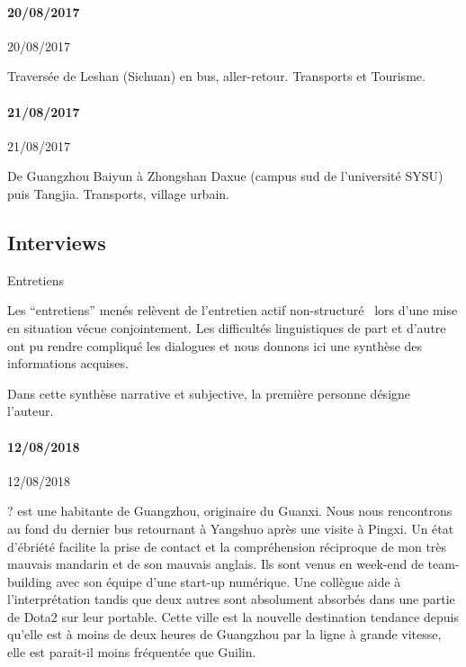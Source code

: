 \paragraph{20/08/2017}{20/08/2017}

Traversée de Leshan (Sichuan) en bus, aller-retour. Transports et Tourisme.



\paragraph{21/08/2017}{21/08/2017}

De Guangzhou Baiyun à Zhongshan Daxue (campus sud de l'université SYSU) puis Tangjia. Transports, village urbain.














\subsection{Interviews}{Entretiens}


Les ``entretiens'' menés relèvent de l'entretien actif non-structuré~\cite{holstein2004active} lors d'une mise en situation vécue conjointement. Les difficultés linguistiques de part et d'autre ont pu rendre compliqué les dialogues et nous donnons ici une synthèse des informations acquises.


Dans cette synthèse narrative et subjective, la première personne désigne l'auteur.



\paragraph{12/08/2018}{12/08/2018}

? est une habitante de Guangzhou, originaire du Guanxi. Nous nous rencontrons au fond du dernier bus retournant à Yangshuo après une visite à Pingxi. Un état d'ébriété facilite la prise de contact et la compréhension réciproque de mon très mauvais mandarin et de son mauvais anglais. Ils sont venus en week-end de team-building avec son équipe d'une start-up numérique. Une collègue aide à l'interprétation tandis que deux autres sont absolument absorbés dans une partie de Dota2 sur leur portable. Cette ville est la nouvelle destination tendance depuis qu'elle est à moins de deux heures de Guangzhou par la ligne à grande vitesse, elle est parait-il moins fréquentée que Guilin.


